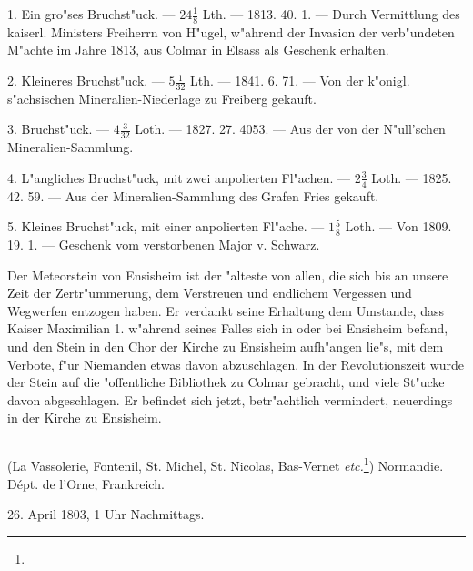 \documentclass[a4paper, 11pt, oneside, polutonikogreek, german]{article}
\begin{document}
1. Ein gro"ses Bruchst"uck. --- $\mathfrak{24\frac{1}{8}}$ Lth. --- 1813. 40. 1. --- Durch Vermittlung des kaiserl. Ministers Freiherrn von H"ugel, w"ahrend der Invasion der verb"undeten M"achte im Jahre 1813, aus Colmar in Elsass als Geschenk erhalten.

2. Kleineres Bruchst"uck. --- $\mathfrak{5\frac{1}{32}}$ Lth. --- 1841. 6. 71. --- Von der k"onigl. s"achsischen Mineralien-Niederlage zu Freiberg gekauft.

3. Bruchst"uck. --- $\mathfrak{4\frac{3}{32}}$ Loth. --- 1827. 27. 4053.
--- Aus der von der N"ull’schen Mineralien-Sammlung.

4. L"angliches Bruchst"uck, mit zwei anpolierten Fl"achen. --- $\mathfrak{2\frac{3}{4}}$ Loth. --- 1825. 42. 59. --- Aus der Mineralien-Sammlung des Grafen Fries gekauft.

5. Kleines Bruchst"uck, mit einer anpolierten Fl"ache. --- $\mathfrak{1\frac{5}{8}}$ Loth. --- Von 1809. 19. 1. --- Geschenk vom verstorbenen Major v. Schwarz.

\setlength{\leftskip}{10mm}
\setlength{\parindent}{0pt}

{\footnotesize Der Meteorstein von Ensisheim ist der "alteste von allen, die sich bis an unsere Zeit der Zertr"ummerung, dem Verstreuen und endlichem Vergessen und Wegwerfen entzogen haben. Er verdankt seine Erhaltung dem Umstande, dass Kaiser Maximilian 1. w"ahrend seines Falles sich in oder bei Ensisheim befand, und den Stein in den Chor der Kirche zu Ensisheim aufh"angen lie"s, mit dem Verbote, f"ur Niemanden etwas davon abzuschlagen. In der Revolutionszeit wurde der Stein auf die "offentliche Bibliothek zu Colmar gebracht, und viele St"ucke davon abgeschlagen. Er befindet sich jetzt, betr"achtlich vermindert, neuerdings in der Kirche zu Ensisheim.}

\setlength{\leftskip}{0pt}
\setlength{\parindent}{20pt}

\subsection{}
\begin{center}

(La Vassolerie, Fontenil, St. Michel, St. Nicolas, Bas-Vernet \emph{etc.}\footnote{}) Normandie. Dépt. de l'Orne, Frankreich.

26. April 1803, 1 Uhr Nachmittags.
\end{center}
\end{document}
